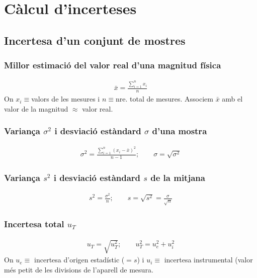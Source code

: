 \section{Càlcul d'incerteses}
\subsection{Incertesa d'un conjunt de mostres}

\subsubsection*{Millor estimació del valor real d'una magnitud física}
\begin{align}
    \boxed{\bar{x} = \frac{\sum\limits_{i=1}^{n} x_{i}}{n}}
\end{align}
On $x_{i} \equiv$valors de les mesures i $n \equiv$nre. total de mesures. Associem $\bar{x}$ amb el valor de la magnitud $\approx$ valor real.

\subsubsection*{Variança $\sigma ^{2}$ i desviació estàndard $\sigma$ d'una mostra}
\begin{align}
    \boxed{\sigma ^{2} = \frac{\sum\limits_{i=1}^{n} \left( x_{i} - \bar{x} \right) ^{2}}{n-1}}; \qquad \boxed{\sigma = \sqrt{\sigma ^{2}}}
\end{align}

\subsubsection*{Variança $s^{2}$ i desviació estàndard $s$ de la mitjana}
\begin{align}
    \boxed{s^{2} = \frac{\sigma ^{2}}{n}}; \qquad \boxed{s = \sqrt{s^{2}} = \frac{\sigma}{\sqrt{n}}}
\end{align}

\subsubsection*{Incertesa total $u_{T}$}
\begin{align}
    \boxed{u_{T} = \sqrt{u_{T}^{2}}}; \qquad \boxed{u_{T}^{2} = u_{e}^{2} + u_{i}^{2}}
\end{align}
On $u_{e} \equiv$ incertesa d'origen estadístic ($=s$) i $u_{i} \equiv$ incertesa instrumental (valor més petit de les divisions de l'aparell de mesura.

